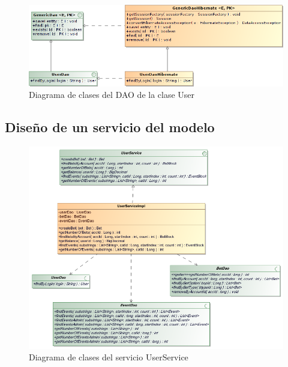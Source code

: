 \documentclass[a4paper,twoside]{article}
\begin{document}
\begin{figure}[H]
  \centering
  \caption{Diagrama de clases del DAO de la clase User}
  \includegraphics[width=\textwidth]{../uml/Class_Diagram__Clases_UserDao.png}
\end{figure}


\subsection{Diseño de un servicio del modelo}


\begin{figure}[H]
  \centering
  \caption{Diagrama de clases del servicio UserService}
  \includegraphics[width=\textwidth]{../uml/Diagramas_it2_imgs/Class_Diagram__Servicio.png}
\end{figure}
\end{document}
